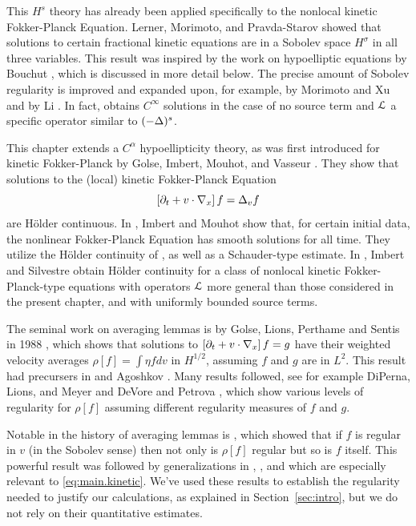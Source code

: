 This $H^s$ theory has already been applied specifically to the nonlocal kinetic Fokker-Planck Equation.  Lerner, Morimoto, and Pravda-Starov \cite{LeMoPr} showed that solutions to certain fractional kinetic equations are in a Sobolev space $H^\sigma$ in all three variables.  This result was inspired by the work on hypoelliptic equations by Bouchut \cite{Bo}, which is discussed in more detail below.  The precise amount of Sobolev regularity is improved and expanded upon, for example, by Morimoto and Xu \cite{MoXu} and by Li \cite{Li}.  In fact, \cite{MoXu} obtains $C^\infty$ solutions in the case of no source term and $\mathcal{L}$ a specific operator similar to $(-\Delta)^s$.  

This chapter extends a $C^\alpha$ hypoellipticity theory, as was first introduced for kinetic Fokker-Planck by Golse, Imbert, Mouhot, and Vasseur \cite{GoImMoVa}.  They show that solutions to the (local) kinetic Fokker-Planck Equation
\[ \left[ \partial_t + v\cdot \nabla_x \right] f = \Delta_v f \]
are H\"{o}lder continuous.  In \cite{ImMo}, Imbert and Mouhot show that, for certain initial data, the nonlinear Fokker-Planck Equation has smooth solutions for all time.  They utilize the H\"{o}lder continuity of \cite{GoImMoVa}, as well as a Schauder-type estimate.  In \cite{ImSi}, Imbert and Silvestre obtain H\"{o}lder continuity for a class of nonlocal kinetic Fokker-Planck-type equations with operators $\mathcal{L}$ more general than those considered in the present chapter, and with uniformly bounded source terms.  

The seminal work on averaging lemmas is by Golse, Lions, Perthame and Sentis in 1988 \cite{GoLiPeSe}, which shows that solutions to $\left[ \partial_t + v\cdot \nabla_x \right] f = g$ have their weighted velocity averages $\rho[f] = \int \eta f dv$ in $H^{1/2}$, assuming $f$ and $g$ are in $L^2$.  This result had precursers in \cite{GoPeSe} and Agoshkov \cite{Ag}.  Many results followed, see for example DiPerna, Lions, and Meyer \cite{DiLiMe} and DeVore and Petrova \cite{DePe}, which show various levels of regularity for $\rho[f]$ assuming different regularity measures of $f$ and $g$.  

Notable in the history of averaging lemmas is \cite{Bo}, which showed that if $f$ is regular in $v$ (in the Sobolev sense) then not only is $\rho[f]$ regular but so is $f$ itself.  This powerful result was followed by generalizations in \cite{LeMoPr}, \cite{MoXu}, and \cite{Li} which are especially relevant to \eqref{eq:main.kinetic}.  We've used these results to establish the regularity needed to justify our calculations, as explained in Section~\ref{sec:intro}, but we do not rely on their quantitative estimates.  

